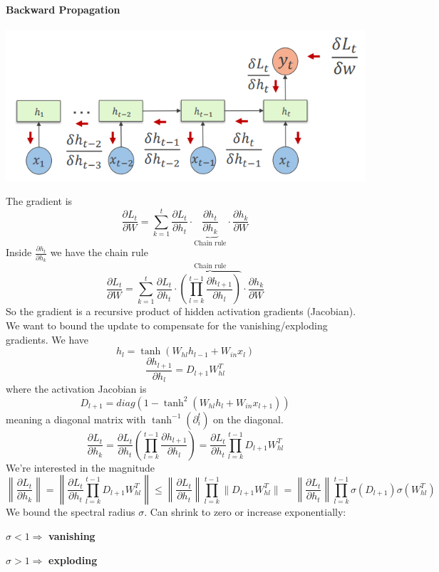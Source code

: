 \documentclass[10pt]{report}
\begin{document}
\paragraph{Backward Propagation}
\begin{center}
	\includegraphics[scale=0.5]{156.png}
\end{center}
The gradient is
$$\frac{\partial L_t}{\partial W} = \sum_{k=1}^t\frac{\partial L_t}{\partial h_t}\cdot\underset{\text{Chain rule}}{\underbrace{\frac{\partial h_t}{\partial h_k}}}\cdot\frac{\partial h_k}{\partial W}$$
Inside $\frac{\partial h_t}{\partial h_k}$ we have the chain rule
$$\frac{\partial L_t}{\partial W} =  \sum_{k=1}^t\frac{\partial L_t}{\partial h_t}\cdot \overset{\text{Chain rule}}{\overbrace{\left(\prod_{l=k}^{t-1}\frac{\partial h_{l+1}}{\partial h_l}\right)}} \cdot\frac{\partial h_k}{\partial W}$$
So the gradient is a recursive product of hidden activation gradients (Jacobian). We want to bound the update to compensate for the vanishing/exploding gradients. We have $$h_l = \tanh(W_{hl}h_{l-1}+W_{in}x_l)$$ $$\frac{\partial h_{l+1}}{\partial h_l} = D_{l+1}W_{hl}^T$$ where the activation Jacobian is $$D_{l+1} = diag(1-\tanh^2(W_{hl}h_l + W_{in}x_{l+1}))$$
meaning a diagonal matrix with $\tanh^{-1}(\partial_i^t)$ on the diagonal.
$$\frac{\partial L_t}{\partial h_k} = \frac{\partial L_t}{\partial h_t}\left(\prod_{l=k}^{t-1}\frac{\partial h_{l+1}}{\partial h_l}\right) = \frac{\partial L_t}{\partial h_t}\prod_{l=k}^{t-1}D_{l+1}W_{hl}^T $$
We're interested in the magnitude 
$$\left\|\frac{\partial L_t}{\partial h_k}\right\| = \left\|\frac{\partial L_t}{\partial h_t}\prod_{l=k}^{t-1}D_{l+1}W_{hl}^T\right\|\leq \left\|\frac{\partial L_t}{\partial h_t}\right\|\prod_{l=k}^{t-1}\|D_{l+1}W_{hl}^T\|= \left\|\frac{\partial L_t}{\partial h_t}\right\|\prod_{l=k}^{t-1}\sigma(D_{l+1})\sigma(W_{hl}^T)$$
We bound the spectral radius $\sigma$. Can shrink to zero or increase exponentially:\begin{list}{}{}
	\item $\sigma < 1 \Rightarrow$ \textbf{vanishing}
	\item $\sigma > 1 \Rightarrow$ \textbf{exploding}
\end{list}
\end{document}
